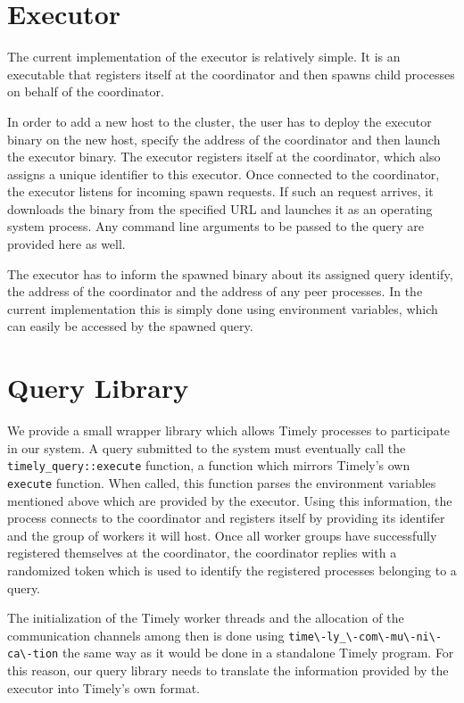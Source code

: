 \section{Executor}

The current implementation of the executor is relatively simple. It is an executable
that registers itself at the coordinator and then spawns child processes on behalf
of the coordinator.

In order to add a new host to the cluster, the user has to deploy the executor
binary on the new host, specify the address of the coordinator and then launch
the executor binary. The executor registers itself at the coordinator, which
also assigns a unique identifier to this executor. Once connected to the
coordinator, the executor listens for incoming spawn requests. If such an
request arrives, it downloads the binary from the specified URL and launches
it as an operating system process. Any command line arguments to be passed
to the query are provided here as well.

The executor has to inform the spawned binary about its assigned query identify,
the address of the coordinator and the address of any peer processes. In the
current implementation this is simply done using environment variables, which
can easily be accessed by the spawned query.


\section{Query Library}

We provide a small wrapper library which allows Timely processes to participate
in our system. A query submitted to the system must eventually call the 
\lstinline{timely_query::execute} function, a function which mirrors Timely's
own \lstinline{execute} function. When called, this function parses the
environment variables mentioned above which are provided by the executor.
Using this information, the process connects to the coordinator and registers
itself by providing its identifer and the group of workers it will host. Once
all worker groups have successfully registered themselves at the coordinator,
the coordinator replies with a randomized token which is used to identify
the registered processes belonging to a query. 

The initialization of the Timely worker threads and the allocation of the
communication channels among then is done using \lstinline{time\-ly_\-com\-mu\-ni\-ca\-tion}
the same way as it would be done in a standalone Timely program. For this
reason, our query library needs to translate the information provided by the
executor into Timely's own format.

